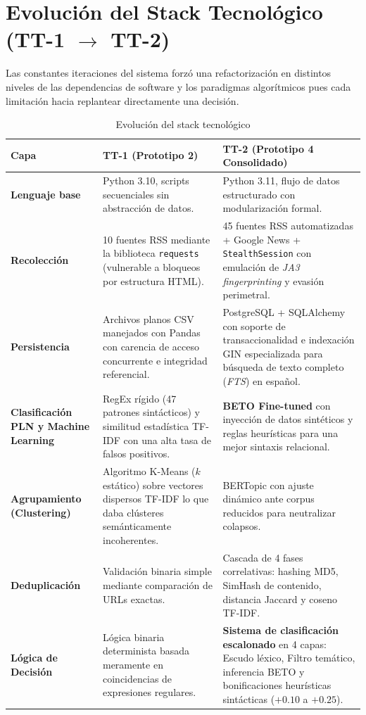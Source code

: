 \section{Evolución del Stack Tecnológico (TT-1 \texorpdfstring{$\rightarrow$}{->} TT-2)} 
\label{sec:met_stack}

Las constantes iteraciones del sistema forzó una refactorización en distintos niveles de las dependencias de
software y los paradigmas algorítmicos pues cada limitación hacia replantear directamente una decisión.

\vspace{0.5cm}
\begin{table}[htbp]
\centering
\caption{Evolución del stack tecnológico}
\label{tab:stack_evolucion}
\begin{tabular}{|p{2.8cm}|p{5.0cm}|p{5.2cm}|}
\hline
\textbf{Capa} &
\textbf{TT-1 (Prototipo 2)} &
\textbf{TT-2 (Prototipo 4 Consolidado)} \\
\hline
\textbf{Lenguaje base} &
Python 3.10, scripts secuenciales sin abstracción de datos. &
Python 3.11, flujo de datos estructurado con modularización formal. \\
\hline
\textbf{Recolección} &
10 fuentes RSS mediante la biblioteca \texttt{requests} (vulnerable a bloqueos por estructura HTML). &
45 fuentes RSS automatizadas + Google News + \texttt{StealthSession} con emulación de \textit{JA3 fingerprinting} y evasión perimetral. \\
\hline
\textbf{Persistencia} &
Archivos planos CSV manejados con Pandas con carencia de acceso concurrente e integridad referencial. &
PostgreSQL + SQLAlchemy con soporte de transaccionalidad e indexación GIN especializada para búsqueda de texto completo
(\textit{FTS}) en español. \\
\hline
\textbf{Clasificación PLN y Machine Learning} &
RegEx rígido (47 patrones sintácticos) y similitud estadística TF-IDF con una alta tasa de falsos positivos. &
\textbf{BETO Fine-tuned} con inyección de datos sintéticos y reglas heurísticas para una mejor sintaxis relacional. \\
\hline
\textbf{Agrupamiento (Clustering)} &
Algoritmo K-Means ($k$ estático) sobre vectores dispersos TF-IDF lo que daba clústeres semánticamente incoherentes. &
BERTopic con ajuste dinámico ante corpus reducidos para neutralizar colapsos. \\
\hline
\textbf{Deduplicación} &
Validación binaria simple mediante comparación de URLs exactas. &
Cascada de 4 fases correlativas: hashing MD5, SimHash de contenido, distancia Jaccard y coseno TF-IDF. \\
\hline
\textbf{Lógica de Decisión} &
Lógica binaria determinista basada meramente en coincidencias de expresiones regulares. &
\textbf{Sistema de clasificación escalonado} en 4 capas: Escudo léxico, Filtro temático, inferencia BETO y bonificaciones heurísticas sintácticas ($+0.10$ a $+0.25$). \\
\hline
\end{tabular}
\end{table}
\vspace{0.4cm}

